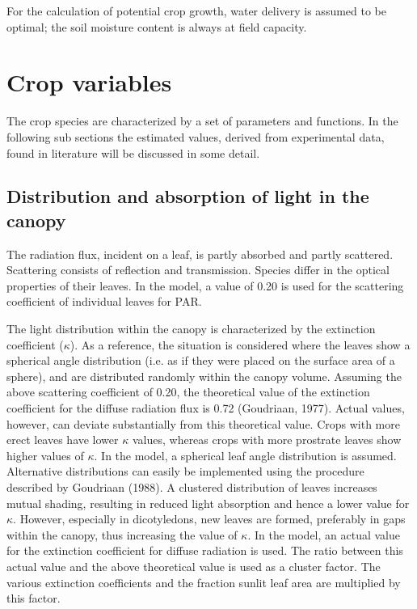 For the calculation of potential crop growth, water delivery is assumed to be optimal; the
soil moisture content is always at field capacity.

\section{Crop variables  }

The crop species are characterized by a set of parameters and functions. In the following
sub sections the estimated values, derived from experimental data, found in litera\-ture will
be discussed in some detail.

\subsection{ Distribution and absorption of light in the canopy  } 

The radiation flux, incident on a leaf, is partly absorbed and partly scattered. Scatter\-ing
consists of reflection and transmission. Species differ in the optical properties of their
leaves. In the model, a value of 0.20 is used for the scattering coefficient of individual 
leaves for PAR.

The light distribution within the canopy is characterized by the extinction coefficient ($\kappa$).
As a reference, the situation is considered where the leaves show a spherical angle
distribution (i.e. as if they were placed on the surface area of a sphere), and are 
distrib\-uted randomly within the canopy volume. Assuming the above scattering coefficient of
0.20, the theoretical value of the extinction coefficient for the diffuse radiation flux is
0.72 (Goudriaan, 1977). Actual values, however, can deviate substan\-tially from this
theoretical value. Crops with more erect leaves have lower $\kappa$ values, whereas crops with
more prostrate leaves show higher values of $\kappa$. In the model, a spherical leaf angle
distribution is assumed. Alternative distributions can easily be implemented using the
procedure described by Goudriaan (1988). A clustered distribution of leaves increases
mutual shading, resulting in reduced light absorption and hence a lower value for $\kappa$.
However, especially in dicotyledons, new leaves are formed, preferably in gaps within the
canopy, thus increasing the value of $\kappa$. In the model, an actual value for the extinction
coefficient for diffuse radiation is used. The ratio between this actual value and the above
theoretical value is used as a cluster factor. The various extinction coefficients and the
fraction sunlit leaf area are multiplied by this factor.

